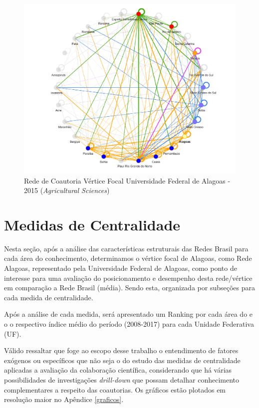 \begin{figure}[H]
	\centering
	\includegraphics[scale=0.6]{Imagens/rede-agr-al-2015.pdf}
	\caption{Rede de Coautoria Vértice Focal Universidade Federal de Alagoas - 2015 (\textit{Agricultural Sciences})}
	\label{rede-2015-al}
\end{figure}

\section{\textbf{Medidas de Centralidade}}

Nesta seção, após a análise das características estruturais das Redes Brasil para cada área do conhecimento, determinamos o vértice focal de Alagoas, como Rede Alagoas, representado pela Universidade Federal de Alagoas, como ponto de interesse para uma avaliação do posicionamento e desempenho desta rede/vértice em comparação a Rede Brasil (média). Sendo esta, organizada por subseções para cada medida de centralidade.

Após a análise de cada medida, será apresentado um Ranking por cada área do e o o respectivo índice médio do período (2008-2017) para cada Unidade Federativa (UF). 

Válido ressaltar que foge ao escopo desse trabalho o entendimento de fatores exógenos ou específicos que não seja o do estudo das medidas de centralidade aplicadas a avaliação da colaboração científica, considerando que há várias possibilidades de investigações \textit{drill-down} que possam detalhar conhecimento complementares a respeito das coautorias. Os gráficos estão plotados em resolução maior no Apêndice \ref{graficos}.

